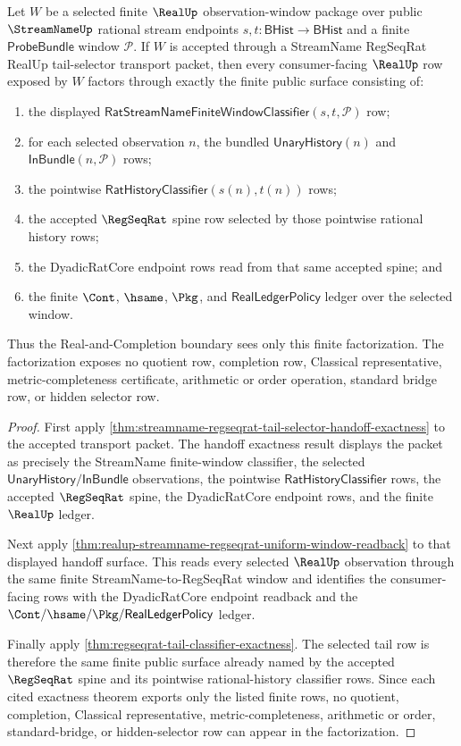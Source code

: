 \begin{theorem}
\label{thm:streamname-regseqrat-tail-selector-real-window-factorization}
Let $W$ be a selected finite $\RealUp$ observation-window package over public
$\StreamNameUp$ rational stream endpoints $s,t:\mathsf{BHist}\to\mathsf{BHist}$
and a finite $\mathsf{ProbeBundle}$ window $\mathcal P$. If $W$ is accepted
through a StreamName RegSeqRat RealUp tail-selector transport packet, then every
consumer-facing $\RealUp$ row exposed by $W$ factors through exactly the finite
public surface consisting of:
\begin{enumerate}
\item the displayed
$\mathsf{RatStreamNameFiniteWindowClassifier}(s,t,\mathcal P)$ row;
\item for each selected observation $n$, the bundled
$\mathsf{UnaryHistory}(n)$ and $\mathsf{InBundle}(n,\mathcal P)$ rows;
\item the pointwise $\mathsf{RatHistoryClassifier}(s(n),t(n))$ rows;
\item the accepted $\RegSeqRat$ spine row selected by those pointwise rational
history rows;
\item the DyadicRatCore endpoint rows read from that same accepted spine; and
\item the finite $\Cont$, $\hsame$, $\Pkg$, and
$\mathsf{RealLedgerPolicy}$ ledger over the selected window.
\end{enumerate}

Thus the Real-and-Completion boundary sees only this finite factorization. The
factorization exposes no quotient row, completion row, Classical representative,
metric-completeness certificate, arithmetic or order operation, standard bridge
row, or hidden selector row.
\end{theorem}
\begin{proof}
First apply
\autoref{thm:streamname-regseqrat-tail-selector-handoff-exactness} to the
accepted transport packet. The handoff exactness result displays the packet as
precisely the StreamName finite-window classifier, the selected
$\mathsf{UnaryHistory}/\mathsf{InBundle}$ observations, the pointwise
$\mathsf{RatHistoryClassifier}$ rows, the accepted $\RegSeqRat$ spine, the
DyadicRatCore endpoint rows, and the finite $\RealUp$ ledger.

Next apply
\autoref{thm:realup-streamname-regseqrat-uniform-window-readback} to that
displayed handoff surface. This reads every selected $\RealUp$ observation
through the same finite StreamName-to-RegSeqRat window and identifies the
consumer-facing rows with the DyadicRatCore endpoint readback and the
$\Cont/\hsame/\Pkg/\mathsf{RealLedgerPolicy}$ ledger.

Finally apply \autoref{thm:regseqrat-tail-classifier-exactness}. The selected
tail row is therefore the same finite public surface already named by the
accepted $\RegSeqRat$ spine and its pointwise rational-history classifier rows.
Since each cited exactness theorem exports only the listed finite rows, no
quotient, completion, Classical representative, metric-completeness,
arithmetic or order, standard-bridge, or hidden-selector row can appear in the
factorization.
\end{proof}

